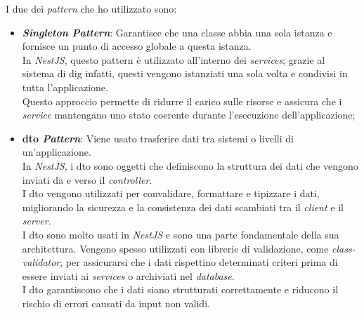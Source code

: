 \noindent I due dei \textit{pattern} che ho utilizzato sono:
\begin{itemize}
    \item \textbf{\textit{Singleton Pattern}}: Garantisce che una classe abbia una sola istanza e fornisce un punto di accesso globale a questa istanza.\\
    In \textit{NestJS}, questo pattern è utilizzato all'interno dei \textit{services};
    grazie al sistema di \gls{dig} infatti, questi vengono istanziati una sola volta e condivisi in tutta l'applicazione.\\
    Questo approccio permette di ridurre il carico sulle risorse e assicura che i \textit{service} mantengano uno stato coerente durante l'esecuzione dell'applicazione;
    \item \textbf{\gls{dto} \textit{Pattern}}: Viene usato trasferire dati tra sistemi o livelli di un'applicazione.\\
    In \textit{NestJS}, i \gls{dto} sono oggetti che definiscono la struttura dei dati che vengono inviati da e verso il \textit{controller}.\\
    I \gls{dto} vengono utilizzati per convalidare, formattare e tipizzare i dati, migliorando la sicurezza e la consistenza dei dati scambiati tra il \textit{client} e il \textit{server}. \\
    I \gls{dto} sono molto usati in \textit{NestJS} e sono una parte fondamentale della sua architettura. Vengono spesso utilizzati con librerie di validazione, come \textit{class-validator}, per assicurarsi che i dati rispettino determinati criteri prima di essere inviati ai \textit{services} o archiviati nel \textit{database}.\\
    I \gls{dto} garantiscono che i dati siano strutturati correttamente e riducono il rischio di errori causati da input non validi.    
\end{itemize}
